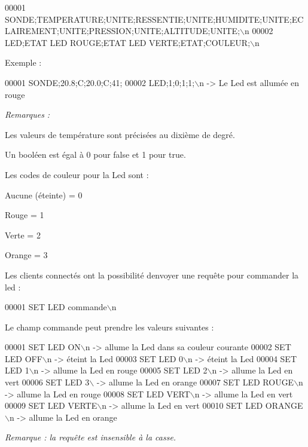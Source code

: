 \begin{DoxyCode}
00001 
      SONDE;TEMPERATURE;UNITE;RESSENTIE;UNITE;HUMIDITE;UNITE;ECLAIREMENT;UNITE;PRESSION;UNITE;ALTITUDE;UNITE;\(\backslash\)n
00002 LED;ETAT LED ROUGE;ETAT LED VERTE;ETAT;COULEUR;\(\backslash\)n
\end{DoxyCode}


Exemple \+:


\begin{DoxyCode}
00001 SONDE;20.8;C;20.0;C;41;%
00002 LED;1;0;1;1;\(\backslash\)n -> Le Led est allumée en rouge
\end{DoxyCode}


{\itshape Remarques \+:}


\begin{DoxyItemize}
\item Les valeurs de température sont précisées au dixième de degré.
\item Un booléen est égal à 0 pour false et 1 pour true.
\item Les codes de couleur pour la Led sont \+:
\begin{DoxyItemize}
\item Aucune (éteinte) = 0
\item Rouge = 1
\item Verte = 2
\item Orange = 3
\end{DoxyItemize}
\end{DoxyItemize}

Les clients connectés ont la possibilité d\textquotesingle{}envoyer une requête pour commander la led \+:


\begin{DoxyCode}
00001 SET LED commande\(\backslash\)n
\end{DoxyCode}


Le champ commande peut prendre les valeurs suivantes \+:


\begin{DoxyCode}
00001 SET LED ON\(\backslash\)n -> allume la Led dans sa couleur courante
00002 SET LED OFF\(\backslash\)n -> éteint la Led
00003 SET LED 0\(\backslash\)n -> éteint la Led
00004 SET LED 1\(\backslash\)n -> allume la Led en rouge
00005 SET LED 2\(\backslash\)n -> allume la Led en vert
00006 SET LED 3\(\backslash\) -> allume la Led en orange
00007 SET LED ROUGE\(\backslash\)n -> allume la Led en rouge
00008 SET LED VERT\(\backslash\)n -> allume la Led en vert
00009 SET LED VERTE\(\backslash\)n -> allume la Led en vert
00010 SET LED ORANGE\(\backslash\)n -> allume la Led en orange
\end{DoxyCode}


{\itshape Remarque \+: la requête est insensible à la casse.} 